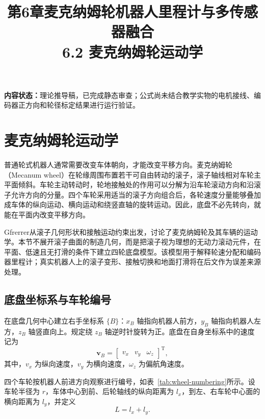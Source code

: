 \documentclass[UTF8,zihao=-4]{ctexart}
\title{第6章麦克纳姆轮机器人里程计与多传感器融合\\
\large 6.2 麦克纳姆轮运动学}
\author{}
\date{}
\newcommand{\vect}[1]{\bm{#1}}
\begin{document}
\maketitle

\noindent
\textbf{内容状态：}理论推导稿，已完成静态审查；公式尚未结合教学实物的电机接线、编码器正方向和轮径标定结果进行运行验证。

\section{麦克纳姆轮运动学}

普通轮式机器人通常需要改变车体朝向，才能改变平移方向。麦克纳姆轮（Mecanum wheel）在轮缘周围布置若干可自由转动的滚子，滚子轴线相对车轮主平面倾斜。车轮主动转动时，轮地接触处的作用可以分解为沿车轮滚动方向和沿滚子允许方向的分量。四个车轮采用适当的滚子方向组合后，各轮速度分量能够叠加成车体的纵向运动、横向运动和绕竖直轴的旋转运动。因此，底盘不必先转向，就能在平面内改变平移方向。

Gfrerrer从滚子几何形状和接触运动约束出发，讨论了麦克纳姆轮及其车辆的运动学\cite{gfrerrer2008}。本节不展开滚子曲面的制造几何，而是把滚子视为理想的无动力滚动元件，在平面、低速且无打滑的条件下建立四轮底盘模型。该模型用于解释轮速分配和编码器里程计；真实机器人上的滚子变形、接触切换和地面打滑将在后文作为误差来源处理。

\subsection{底盘坐标系与车轮编号}

在底盘几何中心建立右手坐标系 $\{B\}$：$x_B$ 轴指向机器人前方，$y_B$ 轴指向机器人左方，$z_B$ 轴竖直向上。规定绕 $z_B$ 轴逆时针旋转为正。底盘在自身坐标系中的速度记为
\begin{equation}
  \vect{v}_B =
  \begin{bmatrix}
    v_x & v_y & \omega_z
  \end{bmatrix}^{\mathrm T},
  \label{eq:body-velocity}
\end{equation}
其中，$v_x$ 为纵向速度，$v_y$ 为横向速度，$\omega_z$ 为偏航角速度。

四个车轮按机器人前进方向观察进行编号，如表~\ref{tab:wheel-numbering}所示。设车轮半径为 $r$，车体中心到前、后轮轴线的纵向距离为 $l_x$，到左、右车轮中心面的横向距离为 $l_y$，并定义
\begin{equation}
  L = l_x + l_y.
  \label{eq:lever-arm}
\end{equation}
\end{document}
